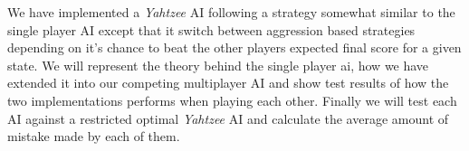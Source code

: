 We have implemented a \emph{Yahtzee} AI following a strategy somewhat similar to the single player AI except that it switch between aggression based strategies depending on it's chance to beat the other players expected final score for a given state. 
We will represent the theory behind the single player ai, how we have extended it into our competing multiplayer AI and show test results of how the two implementations performs when playing each other. 
Finally we will test each AI against a restricted optimal \emph{Yahtzee} AI and calculate the average amount of mistake made by each of them.

